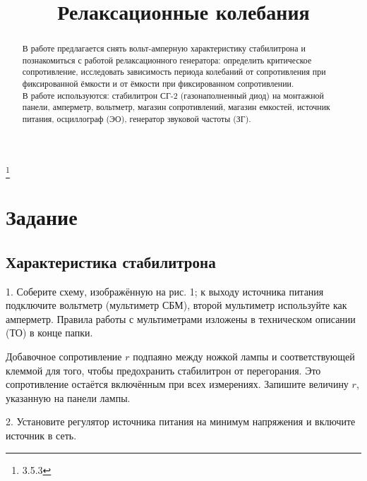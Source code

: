 


\title{Релаксационные колебания}
\thanks{3.5.3}



\begin{abstract}
В работе предлагается снять вольт-амперную характеристику стабилитрона и познакомиться с работой релаксационного генератора: определить критическое сопротивление, исследовать зависимость периода колебаний от сопротивления при фиксированной ёмкости и от ёмкости при фиксированном сопротивлении.\\

В работе используются: стабилитрон СГ-2 (газонаполненный диод) на монтажной панели, амперметр, вольтметр, магазин сопротивлений, магазин емкостей, источник питания, осциллограф (ЭО), генератор звуковой частоты (ЗГ).\\

\end{abstract}

\maketitle


\section{\label{sec:level1}Задание}

\subsection{\label{sec:level2}Характеристика стабилитрона}

1. Соберите схему, изображённую на рис. 1; к выходу источника питания подключите вольтметр (мультиметр СБМ), второй мультиметр используйте как амперметр. Правила работы с мультиметрами изложены в техническом описании (ТО) в конце папки.

Добавочное сопротивление $r$ подпаяно между ножкой лампы и соответствующей клеммой для того, чтобы предохранить стабилитрон от перегорания. Это сопротивление остаётся включённым при всех измерениях. Запишите величину $r$, указанную на панели лампы.

2. Установите регулятор источника питания на минимум напряжения и включите источник в сеть.

